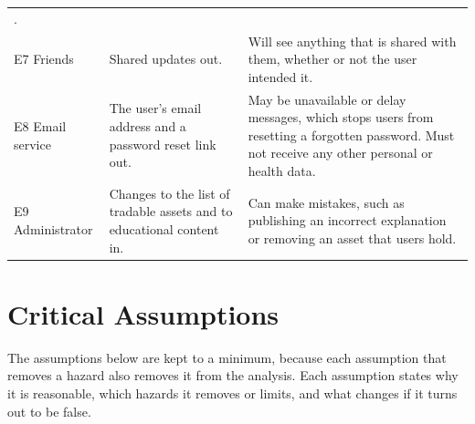 \documentclass{article}
\begin{document}
\begin{table}[H]
\begin{tabularx}{\textwidth}{>{\raggedright\arraybackslash}p{}
    X X}
{    GooglePlayPolicy}.                                                                                                                                                 \\
    E7 Friends                                 & Shared updates out.                                                     & Will see anything that is shared with them,
    whether or not the user intended it.                                                                                                                               \\
    E8 Email service & The user's email address and a password reset link
    out. & May be unavailable or delay messages, which stops users from
    resetting a forgotten password. Must not receive any other personal or
    health data.\\
    E9 Administrator & Changes to the list of tradable assets and to
    educational content in. & Can make mistakes, such as publishing an
    incorrect explanation or removing an asset that users hold.\\
    \bottomrule
  \end{tabularx}
\end{table}
\section{Critical Assumptions} \label{SecAssumptions}



The assumptions below are kept to a minimum, because each assumption that
removes a hazard also removes it from the analysis. Each assumption states why
it is reasonable, which hazards it removes or limits, and what changes if it
turns out to be false.
\end{document}
